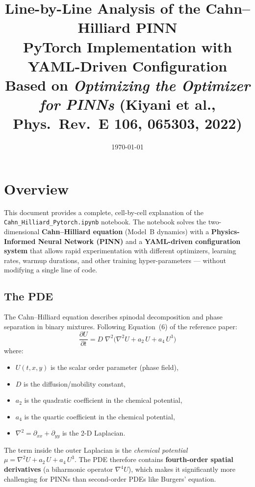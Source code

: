 \documentclass[11pt,a4paper]{article}
\title{%
  \textbf{Line-by-Line Analysis of the Cahn--Hilliard PINN}\\[4pt]
  \large PyTorch Implementation with YAML-Driven Configuration\\[4pt]
  \normalsize Based on \emph{Optimizing the Optimizer for PINNs}
  (Kiyani et al., Phys.\ Rev.\ E \textbf{106}, 065303, 2022)
}
\author{}
\date{\today}
\begin{document}
\maketitle
\tableofcontents
\newpage


\section{Overview}
\label{sec:overview}

This document provides a complete, cell-by-cell explanation of the
\texttt{Cahn\_Hilliard\_Pytorch.ipynb} notebook.  The notebook solves
the two-dimensional \textbf{Cahn--Hilliard equation} (Model~B dynamics)
with a \textbf{Physics-Informed Neural Network (PINN)} and a
\textbf{YAML-driven configuration system} that allows rapid
experimentation with different optimizers, learning rates, warmup
durations, and other training hyper-parameters --- without modifying a
single line of code.

\subsection*{The PDE}

The Cahn--Hilliard equation describes spinodal decomposition and
phase separation in binary mixtures.  Following Equation~(6) of the
reference paper:
\begin{equation}
\boxed{
  \frac{\partial U}{\partial t}
  = D \;\nabla^{2}\!\Big(
      \nabla^{2} U + a_{2}\,U + a_{4}\,U^{3}
    \Big)
}
\label{eq:ch}
\end{equation}
where:
\begin{itemize}[nosep]
  \item $U(t,x,y)$ is the scalar order parameter (phase field),
  \item $D$ is the diffusion/mobility constant,
  \item $a_{2}$ is the quadratic coefficient in the chemical potential,
  \item $a_{4}$ is the quartic coefficient in the chemical potential,
  \item $\nabla^{2} = \partial_{xx} + \partial_{yy}$ is the 2-D Laplacian.
\end{itemize}

The term inside the outer Laplacian is the \emph{chemical potential}
$\mu = \nabla^{2}U + a_{2}\,U + a_{4}\,U^{3}$.  The PDE therefore
contains \textbf{fourth-order spatial derivatives} (a biharmonic
operator $\nabla^{4}U$), which makes it significantly more
challenging for PINNs than second-order PDEs like Burgers' equation.
\end{document}
